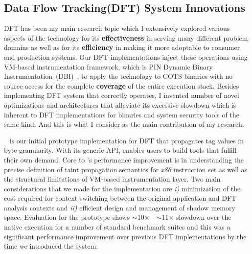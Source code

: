 \documentclass[letterpaper, 10pt]{article}
\begin{document}
\begin{small}
\subsection*{Data Flow Tracking(DFT) System Innovations}
%
DFT has been my main research topic which I extensively explored various
aspects of the technology for its {\bf effectiveness} in serving many different
problem domains as well as for its {\bf efficiency} in making it more adoptable
to consumer and production systems.
%
%
Our DFT implementations inject these operations using VM-based instrumentation
framework, which is PIN Dynamic Binary Instrumentation~(DBI)~\cite{pin}, to
apply the technology to COTS binaries with no source access for the complete
{\bf coverage} of the entire execution stack.
%
Besides implementing DFT system that correctly operates, I invented number of
novel optimizations and architectures that alleviate its excessive slowdown
which is inherent to DFT implementations for binaries and system security tools
of the same kind. And this is what I consider as the main contribution of my
research.


\libdft~\cite{libdft:2012vee} is our initial prototype implementation for DFT
that propagates tag values in byte granularity.
%
With its generic API, \libdft enables users to build tools that fulfill their
own demand. 
%
%
Core to \libdft's performance improvement is in understanding the precise
definition of taint propagation semantics for {\it x86} instruction set as well
as the structural limitations of VM-based instrumentation layer. 
%
%
Two main considerations that we made for the implementation are {\it i)}
minimization of the cost required for context switching between the original
application and DFT analysis contexts and {\it ii)} efficient design and
management of shadow memory space.
%
Evaluation for the prototype shows $\sim$10$\times$ - $\sim$11$\times$ slowdown
over the native execution for a number of standard benchmark suites and this
was a significant performance improvement over previous DFT implementations by
the time we introduced the system.


\end{small}
\end{document}
